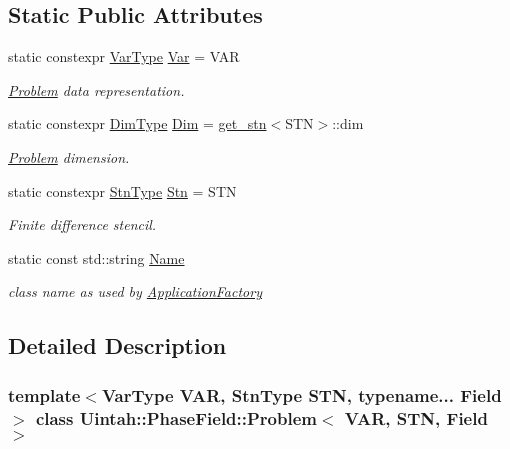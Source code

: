 \subsection*{Static Public Attributes}
\begin{DoxyCompactItemize}
\item 
static constexpr \hyperlink{namespaceUintah_1_1PhaseField_a33d355affda78a83f45755ba8388cedd}{Var\+Type} \hyperlink{classUintah_1_1PhaseField_1_1Problem_a74de1351a682f8523456962f0fc49a18}{Var} = V\+AR
\begin{DoxyCompactList}\small\item\em \hyperlink{classUintah_1_1PhaseField_1_1Problem}{Problem} data representation. \end{DoxyCompactList}\item 
static constexpr \hyperlink{namespaceUintah_1_1PhaseField_a12bfc68444894dffdf0cb8d9cf0cc76a}{Dim\+Type} \hyperlink{classUintah_1_1PhaseField_1_1Problem_a23dbecf657023dd405fc40939661c550}{Dim} = \hyperlink{structUintah_1_1PhaseField_1_1get__stn}{get\+\_\+stn}$<$S\+TN$>$\+::dim
\begin{DoxyCompactList}\small\item\em \hyperlink{classUintah_1_1PhaseField_1_1Problem}{Problem} dimension. \end{DoxyCompactList}\item 
static constexpr \hyperlink{namespaceUintah_1_1PhaseField_a24d833a720598df1020f5cc2e75f8702}{Stn\+Type} \hyperlink{classUintah_1_1PhaseField_1_1Problem_a7f14e7e468084243304784fb9bba0202}{Stn} = S\+TN
\begin{DoxyCompactList}\small\item\em Finite difference stencil. \end{DoxyCompactList}\item 
static const std\+::string \hyperlink{classUintah_1_1PhaseField_1_1Problem_a4573d4e59795aa206d47735ff1a57c85}{Name}
\begin{DoxyCompactList}\small\item\em class name as used by \hyperlink{classUintah_1_1PhaseField_1_1ApplicationFactory}{Application\+Factory} \end{DoxyCompactList}\end{DoxyCompactItemize}


\subsection{Detailed Description}
\subsubsection*{template$<$Var\+Type V\+AR, Stn\+Type S\+TN, typename... Field$>$\newline
class Uintah\+::\+Phase\+Field\+::\+Problem$<$ V\+A\+R, S\+T\+N, Field $>$}

